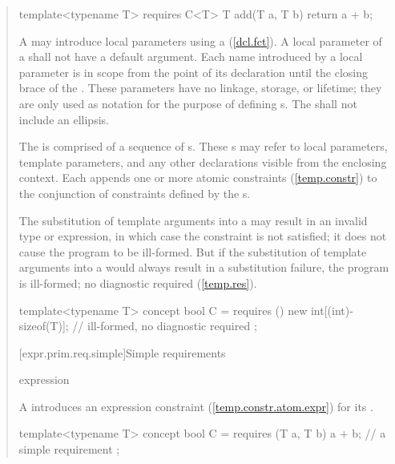\begin{quote}
\begin{codeblock}
template<typename T> requires C<T> 
  T add(T a, T b) { return a + b; }
\end{codeblock}
\exitnote

\pnum
A  may introduce local parameters using a
(\ref{dcl.fct}). 
%
A local parameter of a  shall not have a 
default argument.
%
Each name introduced by a local parameter is in scope from the point
of its declaration until the closing brace of the
.
%
These parameters have no linkage, storage, or lifetime; they are only used
as notation for the purpose of defining s.
%
The  shall
not include an ellipsis.

\pnum
The  is comprised of 
a sequence of s.
%
These s may refer to local 
parameters, template parameters, and any other declarations visible from the 
enclosing context. 
%
Each  appends one or more atomic constraints
(\ref{temp.constr}) to the conjunction of constraints defined by the 
s.

\pnum
The substitution of template arguments into a  may 
result in an invalid type or expression, in which case the constraint is not
satisfied; it does not cause the program to be ill-formed.
%
\enternote
But if the substitution of template arguments into
a  would always result in
a substitution failure, the program is ill-formed; no diagnostic
required (\ref{temp.res}).
\exitnote
%
\enterexample
\begin{codeblock}
template<typename T> concept bool C =
  requires () {
    new int[(int)-sizeof(T)]; // ill-formed, no diagnostic required
  };
\end{codeblock}
\exitexample


[expr.prim.req.simple]{Simple requirements}

\begin{bnf}
    expression \terminal{;}
\end{bnf}

\pnum
A  introduces an expression 
constraint (\ref{temp.constr.atom.expr}) for its 
.

\enterexample
\begin{codeblock}
template<typename T> concept bool C =
  requires (T a, T b) {
    a + b;  // a simple requirement
  };
\end{codeblock}
\exitexample



\end{quote}
